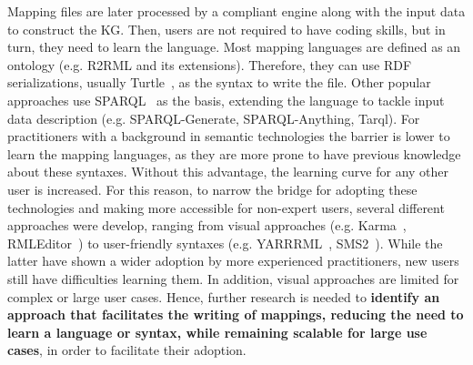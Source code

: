 

Mapping files are later processed by a compliant engine along with the input data to construct the KG. Then, users are not required to have coding skills, but in turn, they need to learn the language. Most mapping languages are defined as an ontology (e.g. R2RML and its extensions). Therefore, they can use RDF serializations, usually Turtle~\parencite{turtle}, as the syntax to write the file. Other popular approaches use SPARQL~\parencite{harris2013sparql} as the basis, extending the language to tackle input data description (e.g. SPARQL-Generate, SPARQL-Anything, Tarql). For practitioners with a background in semantic technologies the barrier is lower to learn the mapping languages, as they are more prone to have previous knowledge about these syntaxes. Without this advantage, the learning curve for any other user is increased. For this reason, to narrow the bridge for adopting these technologies and making more accessible for non-expert users, several different approaches were develop, ranging from visual approaches (e.g. Karma~\parencite{gupta2012karma}, RMLEditor~\parencite{heyvaert2016rmleditor}) to user-friendly syntaxes (e.g. YARRRML~\parencite{Heyvaert2018yarrrml}, SMS2~\parencite{sms2}). While the latter have shown a wider adoption by more experienced practitioners, new users still have difficulties learning them. In addition, visual approaches are limited for complex or large user cases. Hence, further research is needed to \textbf{identify an approach that facilitates the writing of mappings, reducing the need to learn a language or syntax, while remaining scalable for large use cases}, in order to facilitate their adoption. %

